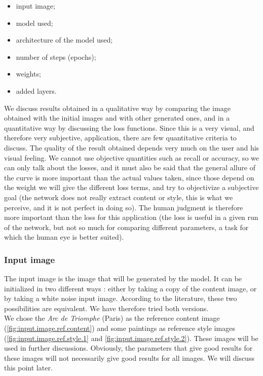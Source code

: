 \documentclass[twocolumn,superscriptaddress,aps,floatfix, nofootinbib]{revtex4-1}
\begin{document}
    \begin{itemize}
        \item input image;
        \item model used;
        \item architecture of the model used;
        \item number of steps (epochs);
        \item weights;
        \item added layers.
    \end{itemize}
    
    We discuss results obtained in a qualitative way by comparing the image obtained with the initial images and with other generated ones, and in a quantitative way by discussing the loss functions. Since this is a very visual, and therefore very subjective, application, there are few quantitative criteria to discuss. The quality of the result obtained depends very much on the user and his visual feeling. We cannot use objective quantities such as recall or accuracy, so we can only talk about the losses, and it must also be said that the general allure of the curve is more important than the actual values taken, since those depend on the weight we will give the different loss terms, and try to objectivize a subjective goal (the network does not really extract content or style, this is what we perceive, and it is not perfect in doing so). The human judgment is therefore more important than the loss for this application (the loss is useful in a given run of the network, but not so much for comparing different parameters, a task for which the human eye is better suited).
    
    \subsubsection{Input image}
    
    The input image is the image that will be generated by the model. It can be initialized in two different ways : either by taking a copy of the content image, or by taking a white noise input image. According to the literature, these two possibilities are equivalent. We have therefore tried both versions.\\
    
    We chose the \emph{Arc de Triomphe} (Paris) as the reference content image (\ref{fig:input.image.ref.content}) and some paintings as reference style images (\ref{fig:input.image.ref.style.1} and \ref{fig:input.image.ref.style.2}). These images will be used in further discussions. Obviously, the parameters that give good results for these images will not necessarily give good results for all images. We will discuss this point later.
    
\end{document}

